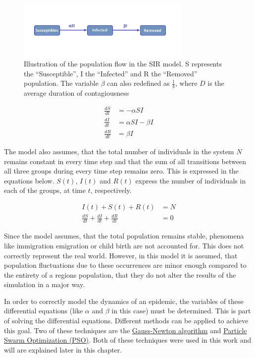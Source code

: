 \begin{figure}
	\begin{center}
		\includegraphics[width=0.75\textwidth]{./figures/SIR.png}
		\caption{Illustration of the population flow in the SIR model. S represents the ``Susceptible'', I
			the ``Infected'' and R the ``Removed'' population. The variable $\beta$ can also redefined
			as $\frac{1}{b}$, where $D$ is the average duration of contagiousness}
		\label{fig:SIR}
	\end{center}
\end{figure}


\begin{align}
	\label{eq:SIR1}
	\frac{dS}{dt} &= -\alpha S I \\
	\frac{dI}{dt} &= \alpha S I - \beta I \\
	\frac{dR}{dt} &= \beta I
\end{align}


The model also assumes, that the total number of individuals in the system $N$ remains constant in every time step and
that the sum of all transitions between all three groups during every time step remains zero. This is expressed in the equations below.
$S(t)$, $I(t)$ and $R(t)$ express the number of individuals in each of the groups, at time $t$, respectively.

\begin{align}
	\label{eq:SIR2}
	I(t) + S(t) + R(t) &= N \\
	\frac{dS}{dt} + \frac{dI}{dt} + \frac{dR}{dt} &= 0
\end{align}


Since the model assumes, that the total population remains stable, phenomena like immigration emigration or child birth are not accounted
for. This does not correctly represent the real world. However, in this model it is assumed, that population fluctuations
due to these occurrences are minor enough compared to the entirety of a regions population, that they do not alter the results of the
simulation in a major way\cite{??}.\newline


In order to correctly model the dynamics of an epidemic, the variables of these differential
equations (like $\alpha$ and $\beta$ in this case) must be determined. This is part of solving the differential equations.
Different methods can be applied to achieve this goal. Two of these techniques are the \hyperref[sec:Gauss]{Gauss-Newton algorithm}\cite{Gauss??}
and \hyperref[sec:PSO]{Particle Swarm Optimization (PSO)}\cite{PSO??}. Both of these techniques were used in this work and will are explained
later in this chapter.


